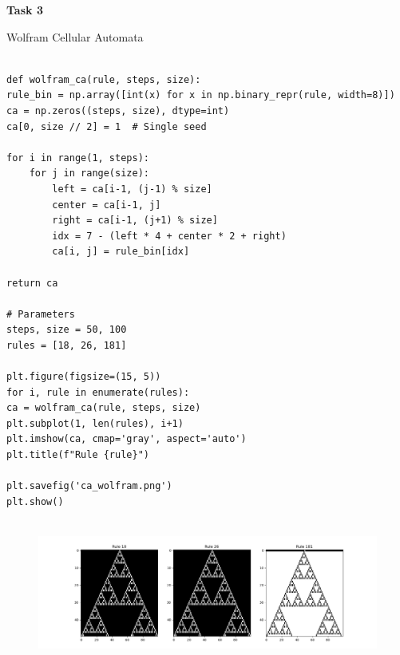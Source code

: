 \documentclass[10pt,letterpaper, onecolumn]{report}
\begin{document}
\break\hfill

\begin{flushleft}
    \begin{flushleft}
        \textbf{Task 3}
        \hfill\break
        \setlength{\parindent}{1.5em} %
        \setlength{\parskip}{0.5em}   %

        Wolfram Cellular Automata

        \begin{lstlisting}[style=myPythonStyle, caption={Flea on the very left dog}]

def wolfram_ca(rule, steps, size):
rule_bin = np.array([int(x) for x in np.binary_repr(rule, width=8)])
ca = np.zeros((steps, size), dtype=int)
ca[0, size // 2] = 1  # Single seed

for i in range(1, steps):
    for j in range(size):
        left = ca[i-1, (j-1) % size]
        center = ca[i-1, j]
        right = ca[i-1, (j+1) % size]
        idx = 7 - (left * 4 + center * 2 + right)
        ca[i, j] = rule_bin[idx]

return ca

# Parameters
steps, size = 50, 100
rules = [18, 26, 181]

plt.figure(figsize=(15, 5))
for i, rule in enumerate(rules):
ca = wolfram_ca(rule, steps, size)
plt.subplot(1, len(rules), i+1)
plt.imshow(ca, cmap='gray', aspect='auto')
plt.title(f"Rule {rule}")

plt.savefig('ca_wolfram.png')
plt.show()
        
        \end{lstlisting}

        \begin{figure}[htbp!] %
            \centering
            \includegraphics[width=1\textwidth]{../ca_wolfram.png} %
        \end{figure}

    \end{flushleft}

\end{flushleft}
\end{document}
